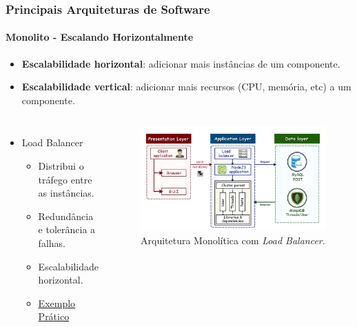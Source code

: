 \documentclass[
	10pt, %
	t, %
]{beamer}
\begin{document}
\begin{frame}
	\frametitle{Principais Arquiteturas de Software}
	\framesubtitle{Monolito - Escalando Horizontalmente}

	\begin{itemize}
		\item \textbf{Escalabilidade horizontal}: adicionar mais instâncias de um componente.
		\item \textbf{Escalabilidade vertical}: adicionar mais recursos (CPU, memória, etc) a um componente.
	\end{itemize}
	
	\begin{columns}
		{\small 
		\begin{itemize}
			\item Load Balancer
			\begin{itemize}
				\item Distribui o tráfego entre as instâncias.
				\item Redundância e tolerância a falhas.
				\item Escalabilidade horizontal.
				\item \href{https://www.tech-hour.com/nodejs-nginx-load-balancer}{Exemplo Prático}
			\end{itemize}
		\end{itemize}
		}
		\begin{figure}
			\centering
			\includegraphics[width=0.9\linewidth]{Images/monolito-balancer.jpg}
			\caption{Arquitetura Monolítica com \textit{Load Balancer}.}\label{fig:monolito-balancer}
		\end{figure}

	\end{columns}

\end{frame}
\end{document}
